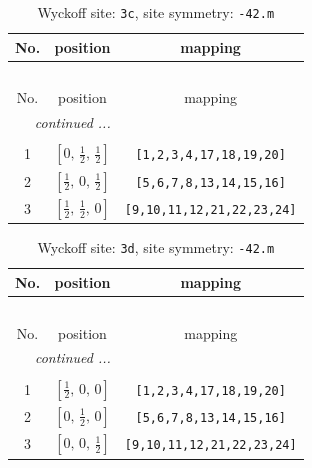 \documentclass[fleqn,8pt]{jsarticle}
\begin{document}
\begin{longtable}{ccc}
\caption{Wyckoff site: {\tt 3c}, site symmetry: {\tt -42.m}}
 \\
 \hline \hline
No. & position & mapping \\ \hline \endfirsthead

\multicolumn{2}{l}{\tablename\ \thetable{}} \\
 \hline \hline
No. & position & mapping \\ \hline \endhead

 \hline \hline
\multicolumn{2}{r}{\footnotesize\it continued ...} \\ \endfoot

 \hline \hline
\multicolumn{2}{r}{} \\ \endlastfoot

1 & $\left[ 0,\, \frac{1}{2},\, \frac{1}{2} \right]$ & {\tt [1,2,3,4,17,18,19,20]} \\ \hline
2 & $\left[ \frac{1}{2},\, 0,\, \frac{1}{2} \right]$ & {\tt [5,6,7,8,13,14,15,16]} \\ \hline
3 & $\left[ \frac{1}{2},\, \frac{1}{2},\, 0 \right]$ & {\tt [9,10,11,12,21,22,23,24]} \\
\end{longtable}
\renewcommand{\arraystretch}{1.2}
\begin{longtable}{ccc}
\caption{Wyckoff site: {\tt 3d}, site symmetry: {\tt -42.m}}
 \\
 \hline \hline
No. & position & mapping \\ \hline \endfirsthead

\multicolumn{2}{l}{\tablename\ \thetable{}} \\
 \hline \hline
No. & position & mapping \\ \hline \endhead

 \hline \hline
\multicolumn{2}{r}{\footnotesize\it continued ...} \\ \endfoot

 \hline \hline
\multicolumn{2}{r}{} \\ \endlastfoot

1 & $\left[ \frac{1}{2},\, 0,\, 0 \right]$ & {\tt [1,2,3,4,17,18,19,20]} \\ \hline
2 & $\left[ 0,\, \frac{1}{2},\, 0 \right]$ & {\tt [5,6,7,8,13,14,15,16]} \\ \hline
3 & $\left[ 0,\, 0,\, \frac{1}{2} \right]$ & {\tt [9,10,11,12,21,22,23,24]} \\
\end{longtable}
\renewcommand{\arraystretch}{1.2}
\end{document}
